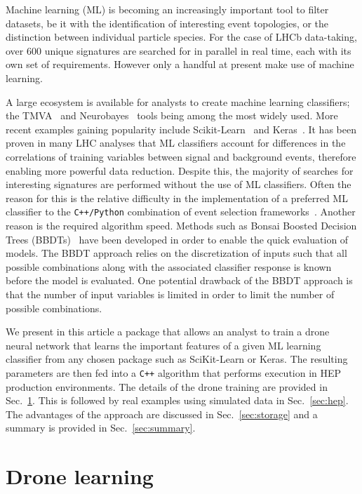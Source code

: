 \documentclass[final,5p,times,twocolumn]{elsarticle}
\def\lhcb {\mbox{LHCb}\xspace}
\begin{document}
Machine learning (ML) is becoming an increasingly important tool to filter datasets,
be it with the identification of interesting event topologies, or the distinction
between individual particle species. For the case of \lhcb data-taking, over 600
unique signatures are searched for in parallel in real time, each with its own set of requirements.
However only a handful at present make use of machine learning.

A large ecosystem is available for analysts to create machine learning classifiers;
the TMVA~\cite{Hocker:2007ht} and Neurobayes~\cite{Feindt:2006pm} tools being among the most widely used.
More recent examples gaining popularity include Scikit-Learn~\cite{Pedregosa:2012toh}
and Keras~\cite{keras}. It has been proven in many LHC analyses that
ML classifiers account for differences in the correlations of
training variables between signal and background events, therefore enabling more
powerful data reduction.
Despite this, the majority of searches for interesting signatures are performed
without the use of ML classifiers. Often the reason for this is the relative difficulty in
the implementation of a preferred ML classifier to the {\tt C++/Python} combination
of event selection frameworks~\cite{Barrand:2001ny}. Another
reason is the required algorithm speed. Methods such as Bonsai
Boosted Decision Trees (BBDTs)~\cite{Gligorov:2012qt} have been developed in order
to enable the quick evaluation of models. The BBDT approach relies on the
discretization of inputs such that all possible combinations along with
the associated classifier response is known before the model is evaluated.
One potential drawback of the BBDT approach is that the number of input variables is limited
in order to limit the number of possible combinations.

We present in this article a package that allows an analyst to
train a drone neural network that learns the important features of a
given ML learning classifier from any chosen package such as SciKit-Learn or Keras.
The resulting parameters are then fed into a {\tt C++} algorithm that
performs execution in HEP production environments. The details of the
drone training are provided in Sec.~\ref{sec:dlearn}. This is followed
by real examples using simulated data in Sec.~\ref{sec:hep}. The advantages
of the approach are discussed in Sec.~\ref{sec:storage} and a summary is
provided in Sec.~\ref{sec:summary}.


\section{Drone learning}
\label{sec:dlearn}
\end{document}
